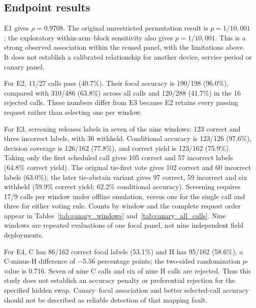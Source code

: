 \subsection{Endpoint results}
E1 gives $\rho=0.9708$. The original unrestricted permutation result is $p=1/10{,}001$; the exploratory within-arm--block sensitivity also gives $p=1/10{,}001$. This is a strong observed association within the reused panel, with the limitations above. It does not establish a calibrated relationship for another device, service period or canary panel.

For E2, 11/27 calls pass (40.7\%). Their focal accuracy is 190/198 (96.0\%), compared with 310/486 (63.8\%) across all calls and 120/288 (41.7\%) in the 16 rejected calls. These numbers differ from E3 because E2 retains every passing request rather than selecting one per window.

For E3, screening releases labels in seven of the nine windows: 123 correct and three incorrect labels, with 36 withheld. Conditional accuracy is 123/126 (97.6\%), decision coverage is 126/162 (77.8\%), and correct yield is 123/162 (75.9\%). Taking only the first scheduled call gives 105 correct and 57 incorrect labels (64.8\% correct yield). The original tie-first vote gives 102 correct and 60 incorrect labels (63.0\%); the later tie-abstain variant gives 97 correct, 59 incorrect and six withheld (59.9\% correct yield; 62.2\% conditional accuracy). Screening requires 17/9 calls per window under offline emulation, versus one for the single call and three for either voting rule. Counts by window and the complete request order appear in Tables~\ref{tab:canary_windows} and~\ref{tab:canary_all_calls}. Nine windows are repeated evaluations of one focal panel, not nine independent field deployments.

For E4, C has 86/162 correct focal labels (53.1\%) and H has 95/162 (58.6\%), a C-minus-H difference of $-5.56$ percentage points; the two-sided randomization $p$-value is 0.716. Seven of nine C calls and six of nine H calls are rejected. Thus this study does not establish an accuracy penalty or preferential rejection for the specified hidden swap. Canary--focal association and better selected-call accuracy should not be described as reliable detection of that mapping fault.

